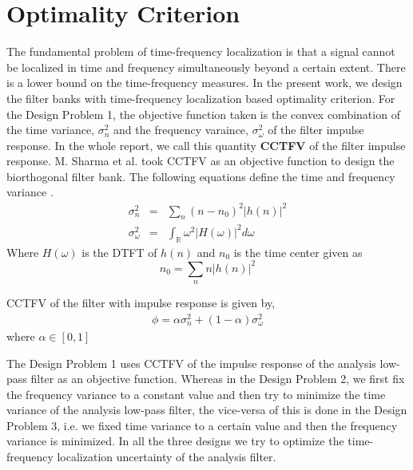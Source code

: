 \section{Optimality Criterion}
The fundamental problem of time-frequency localization is that a signal cannot be localized in time and frequency simultaneously beyond a certain extent. There is a lower bound on the time-frequency measures. In the present work, we design the filter banks with time-frequency localization based optimality criterion. For the Design Problem 1, the objective function taken is the convex combination of the time variance, $\sigma_n^2$ and the frequency varaince, $\sigma_\omega^2$ of the filter impulse response. In the whole report, we call this quantity \textbf{CCTFV} of the filter impulse response.  M. Sharma et al. \cite{CSSP} took CCTFV as an objective function to design the biorthogonal filter bank. The following equations define the time and frequency variance \cite{key-11, key-36}.
\begin{eqnarray*}
\sigma_n^2 &=& \sum_{n}(n-n_0)^2 |h(n)|^2 \\
\sigma_\omega^2 &=& \int_{\mathbb{R}} \omega^2 |H(\omega)|^2 d\omega
\end{eqnarray*}
Where $H(\omega)$ is the DTFT of $h(n)$ and $n_0$ is the time center given as
$$n_0 = \sum_{n}n|h(n)|^2$$

CCTFV \cite{CSSP} of the filter with impulse response is given by,
\begin{eqnarray*}
\phi = \alpha \sigma_n^2 + (1 - \alpha) \sigma_\omega^2
\end{eqnarray*}
where $\alpha \in [0,1]$

The Design Problem 1 uses CCTFV of the impulse response of the analysis low-pass filter as an objective function. Whereas in the Design Problem 2, we first fix the frequency variance to a constant value and then try to minimize the time variance of the analysis low-pass filter, the vice-versa of this is done in the Design Problem 3, i.e. we fixed time variance to a certain value and then the frequency variance is minimized. In all the three designs we try to optimize the time-frequency localization uncertainty of the analysis filter.


